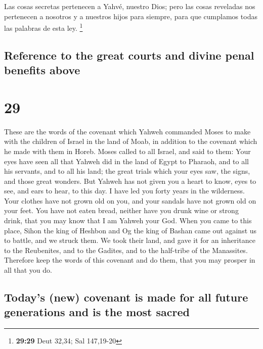 \begin{paracol}{2}
 Las cosas secretas pertenecen a Yahvé, nuestro Dios;
pero las cosas reveladas nos pertenecen a nosotros y a nuestros hijos
para siempre, para que cumplamos todas las palabras de esta ley.
\footnote{\textbf{29:29} Deut 32,34; Sal 147,19-20}

\switchcolumn
\begin{otherlanguage}{english}

\hypertarget{reference-to-the-great-courts-and-divine-penal-benefits-above}{%
\subsection{Reference to the great courts and divine penal benefits
above}\label{reference-to-the-great-courts-and-divine-penal-benefits-above}}

\hypertarget{section-57}{%
\section{29}\label{section-57}}

 These are the words of the covenant which Yahweh
commanded Moses to make with the children of Israel in the land of Moab,
in addition to the covenant which he made with them in Horeb.
 Moses called to all Israel, and said to them: Your eyes
have seen all that Yahweh did in the land of Egypt to Pharaoh, and to
all his servants, and to all his land;  the great trials
which your eyes saw, the signs, and those great wonders. 
But Yahweh has not given you a heart to know, eyes to see, and ears to
hear, to this day.  I have led you forty years in the
wilderness. Your clothes have not grown old on you, and your sandals
have not grown old on your feet.  You have not eaten
bread, neither have you drunk wine or strong drink, that you may know
that I am Yahweh your God.  When you came to this place,
Sihon the king of Heshbon and Og the king of Bashan came out against us
to battle, and we struck them.  We took their land, and
gave it for an inheritance to the Reubenites, and to the Gadites, and to
the half-tribe of the Manassites.  Therefore keep the
words of this covenant and do them, that you may prosper in all that you
do.

\hypertarget{todays-new-covenant-is-made-for-all-future-generations-and-is-the-most-sacred}{%
\subsection{Today's (new) covenant is made for all future generations
and is the most
sacred}\label{todays-new-covenant-is-made-for-all-future-generations-and-is-the-most-sacred}}


\end{otherlanguage}
\end{paracol}
